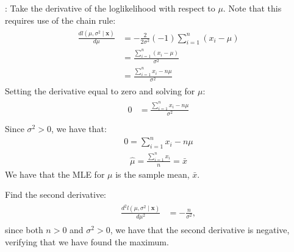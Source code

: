 \documentclass[letterpaper,10pt,english]{jupyterBook}
\begin{document}
\sphinxAtStartPar
{}: Take the derivative of the log\sphinxhyphen{}likelihood with respect to  \(\mu\). Note that this requires use of the chain rule:
\begin{equation*}
\begin{split}
\begin{align}  
\frac{d l \left(\mu, \sigma^2 \mid  \mathbf{x}  \right) }{d \mu}
&=  -\frac{2}{2\sigma^2}(-1) \sum_{i=1}^n (x_i-\mu) \\
&=  \frac{ \sum_{i=1}^n (x_i-\mu)}{\sigma^2} \\
&=  \frac{ \sum_{i=1}^n x_i-n\mu}{\sigma^2}
\end{align}
\end{split}
\end{equation*}
\sphinxAtStartPar
{} Setting the derivative equal to zero and solving for \(\mu\):
\begin{equation*}
\begin{split}
\begin{align}  
0 &=  \frac{ \sum_{i=1}^n x_i-n\mu}{\sigma^2} \\
\end{align}
\end{split}
\end{equation*}
\sphinxAtStartPar
Since \(\sigma^2 > 0\), we have that:
\begin{equation*}
\begin{split}
\begin{equation}  
0 = \sum_{i=1}^n x_i-n\mu 
\end{equation}
\end{split}
\end{equation*}\begin{equation*}
\begin{split}
\begin{equation}  
\hat{\mu} =\frac{ \sum_{i=1}^n x_i}{n} = \bar{x}
\end{equation}
\end{split}
\end{equation*}
\sphinxAtStartPar
We have that the MLE for \(\mu\) is the sample mean, \(\bar{x}\).

\sphinxAtStartPar
{} Find the second derivative:
\begin{equation*}
\begin{split}
\begin{align}  
\frac{d^2 l \left(\mu, \sigma^2 \mid  \mathbf{x}  \right) }{d \mu^2 }
&=  -\frac{n}{\sigma^2},
\end{align}
\end{split}
\end{equation*}
\sphinxAtStartPar
since both \(n>0\) and \(\sigma^2 >0\), we have that the second derivative is negative, verifying that we have found the maximum.
\end{document}
